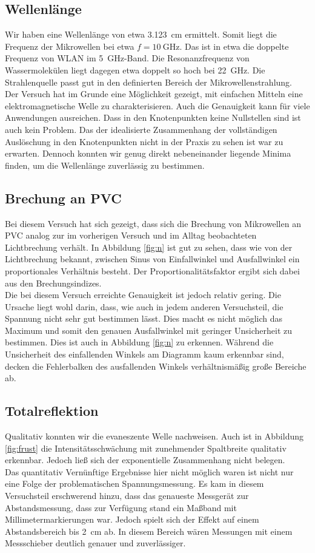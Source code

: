 \subsection{Wellenlänge}
Wir haben eine Wellenlänge von etwa \SI{3.123}{\centi\meter} ermittelt. Somit liegt die Frequenz der Mikrowellen bei etwa $ f = \SI{10}{\giga\hertz} $. Das ist in etwa die doppelte Frequenz von WLAN im \SI{5}{\giga\hertz}-Band. Die Resonanzfrequenz von Wassermolekülen liegt dagegen etwa doppelt so hoch bei \SI{22}{\giga\hertz}. Die Strahlenquelle passt gut in den definierten Bereich der Mikrowellenstrahlung.\\
Der Versuch hat im Grunde eine Möglichkeit gezeigt, mit einfachen Mitteln eine elektromagnetische Welle zu charakterisieren. Auch die Genauigkeit kann für viele Anwendungen ausreichen. Dass in den Knotenpunkten keine Nullstellen sind ist auch kein Problem. Das der idealisierte Zusammenhang der vollständigen Auslöschung in den Knotenpunkten nicht in der Praxis zu sehen ist war zu erwarten. Dennoch konnten wir genug direkt nebeneinander liegende Minima finden, um die Wellenlänge zuverlässig zu bestimmen. 

\subsection{Brechung an PVC}
Bei diesem Versuch hat sich gezeigt, dass sich die Brechung von Mikrowellen an PVC analog zur im vorherigen Versuch und im Alltag beobachteten Lichtbrechung verhält. In Abbildung \ref{fig:n} ist gut zu sehen, dass wie von der Lichtbrechung bekannt, zwischen Sinus von Einfallwinkel und Ausfallwinkel ein proportionales Verhältnis besteht. Der Proportionalitätsfaktor ergibt sich dabei aus den Brechungsindizes. \\
Die bei diesem Versuch erreichte Genauigkeit ist jedoch relativ gering. Die Ursache liegt wohl darin, dass, wie auch in jedem anderen Versuchsteil, die Spannung nicht sehr gut bestimmen lässt. Dies macht es nicht möglich das Maximum und somit den genauen Ausfallwinkel mit geringer Unsicherheit zu bestimmen. Dies ist auch in Abbildung \ref{fig:n} zu erkennen. Während die Unsicherheit des einfallenden Winkels am Diagramm kaum erkennbar sind, decken die Fehlerbalken des ausfallenden Winkels verhältnismäßig große Bereiche ab.

\subsection{Totalreflektion}
Qualitativ konnten wir die evaneszente Welle nachweisen. Auch ist in Abbildung \ref{fig:frust} die Intensitätsschwächung mit zunehmender Spaltbreite qualitativ erkennbar. Jedoch ließ sich der exponentielle Zusammenhang nicht belegen. \\
Das quantitativ Vernünftige Ergebnisse hier nicht möglich waren ist nicht nur eine Folge der problematischen Spannungsmessung. Es kam in diesem Versuchsteil erschwerend hinzu, dass das genaueste Messgerät zur Abstandsmessung, dass zur Verfügung stand ein Maßband mit Millimetermarkierungen war. Jedoch spielt sich der Effekt auf einem Abstandsbereich bis \SI{2}{\centi\meter} ab. In diesem Bereich wären Messungen mit einem Messschieber deutlich genauer und zuverlässiger. 

